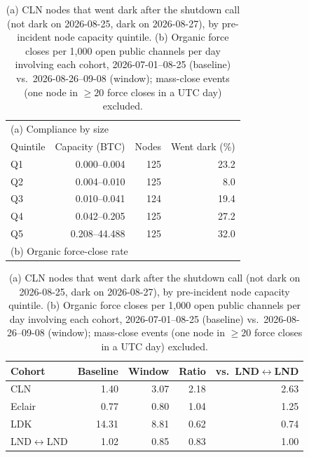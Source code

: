 \begin{table}[t]
\centering
\caption{(a) CLN nodes that went dark after the shutdown call (not dark on 2026-08-25, dark on 2026-08-27), by
pre-incident node capacity quintile. (b) Organic force closes per 1{,}000 open public channels per day involving
each cohort, 2026-07-01--08-25 (baseline) vs.\ 2026-08-26--09-08 (window); mass-close events (one node in
$\geq 20$ force closes in a UTC day) excluded.}
\label{tab:outage-compliance}
\small
\begin{tabular}{lrrr}
\toprule
\multicolumn{4}{l}{(a) Compliance by size} \\
Quintile & Capacity (BTC) & Nodes & Went dark (\%) \\
\midrule
Q1 & 0.000--0.004 & 125 & 23.2 \\
Q2 & 0.004--0.010 & 125 & 8.0 \\
Q3 & 0.010--0.041 & 124 & 19.4 \\
Q4 & 0.042--0.205 & 125 & 27.2 \\
Q5 & 0.208--44.488 & 125 & 32.0 \\
\midrule
\multicolumn{4}{l}{(b) Organic force-close rate} \\
\end{tabular}
\begin{tabular}{lrrrr}
Cohort & Baseline & Window & Ratio & vs.\ LND$\leftrightarrow$LND \\
\midrule
CLN & 1.40 & 3.07 & 2.18 & 2.63 \\
Eclair & 0.77 & 0.80 & 1.04 & 1.25 \\
LDK & 14.31 & 8.81 & 0.62 & 0.74 \\
LND$\leftrightarrow$LND & 1.02 & 0.85 & 0.83 & 1.00 \\
\bottomrule
\end{tabular}
\end{table}
